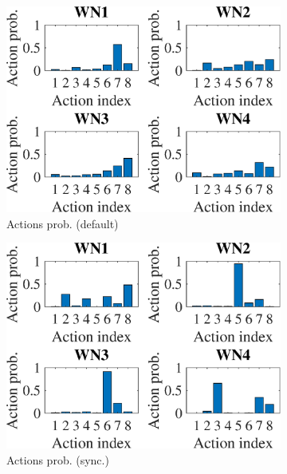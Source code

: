 \documentclass[preprint,12pt]{article}
\begin{document}
\begin{figure}[h!]
	\centering
	\begin{subfigure}[b]{.33\textwidth}
		\includegraphics[width=\textwidth]{images/actions_probability_EG}
		\caption{Actions prob. (default)}\label{fig:actions_probability_EG}
	\end{subfigure}
	\begin{subfigure}[b]{.33\textwidth}
		\includegraphics[width=\textwidth]{images/actions_probability_OEG}
		\caption{Actions prob. (sync.)}\label{fig:actions_probability_OEG}
	\end{subfigure}\\
	\begin{subfigure}[b]{.33\textwidth}

\end{subfigure}
\end{figure}
\end{document}
